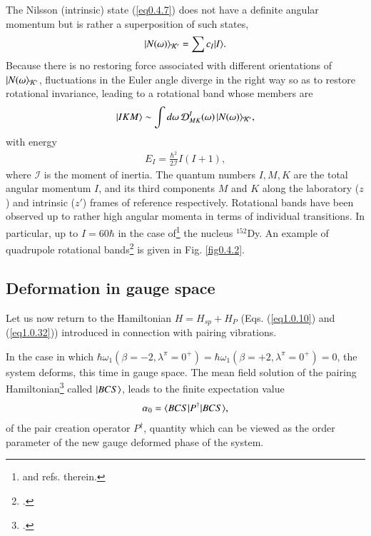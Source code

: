 The Nilsson (intrinsic) state (\ref{eq0.4.7}) does not have a definite angular momentum but is rather a superposition of such states,
\begin{align}\label{eq0.4.11}
|{N(\omega)} \rangle_{\mathcal K'}=\sum c_I|{I} \rangle.
\end{align}
Because there is no restoring force associated with different orientations of $|{N(\omega} \rangle_{\mathcal K'}$, fluctuations in the Euler angle diverge in the right way so as to restore rotational invariance, leading to a rotational band whose members are 
\begin{align}\label{eq0.1.47}
|{IKM} \rangle\sim\int d\omega \,\mathcal D^I_{MK}(\omega)\,|{N(\omega)} \rangle_{\mathcal K'},
\end{align}
with energy
\begin{align}\label{eq0.1.48}
E_I=\frac{\hbar^2}{2\mathcal I}I(I+1),
\end{align}
where $\mathcal I$ is the moment of inertia.
The quantum numbers $I,M,K$ are the total angular momentum $I$, and its third components $M$ and $K$ along the laboratory ($z$) and intrinsic ($z'$) frames of reference respectively.
Rotational bands have been observed up to rather high angular momenta in terms of individual transitions. In particular, up to $I=60\hbar$ in the case of\footnote{\cite{Nolan:88} and refs. therein.} the nucleus $^{152}$Dy. An example of quadrupole rotational bands\footnote{\cite{Burde:82,Hausser:80}.}  is given in Fig. \ref{fig0.4.2}. 
\subsection{Deformation in gauge space}\label{S1.4.2}
Let us now return to the Hamiltonian $H=H_{sp}+H_{P}$  (Eqs. (\ref{eq1.0.10}) and (\ref{eq1.0.32})) introduced in connection with pairing vibrations. 


In the case in which \mbox{$\hbar\omega_1(\beta=-2,\lambda^{\pi}=0^+)=\hbar\omega_1(\beta=+2,\lambda^\pi=0^+)=0$}, the system deforms, this time in gauge space. The  mean field solution  of the pairing Hamiltonian\footnote{\cite{Bardeen:57a,Bardeen:57b}.} called $|{BCS} \rangle$,  leads to the finite expectation value 
\begin{align}\label{eq0.4.14}
\alpha_0=\langle {BCS|P^\dagger|BCS} \rangle,
 \end{align}
   of the pair creation operator $P^\dagger$, quantity which can be viewed as the order parameter of the new gauge deformed  phase of the system. 
   
